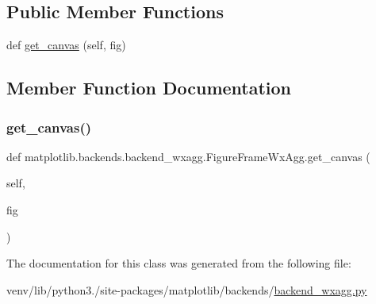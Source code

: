 \subsection*{Public Member Functions}
\begin{DoxyCompactItemize}
\item 
def \hyperlink{classmatplotlib_1_1backends_1_1backend__wxagg_1_1FigureFrameWxAgg_a999c74398921edcabde76d917f9472ee}{get\+\_\+canvas} (self, fig)
\end{DoxyCompactItemize}


\subsection{Member Function Documentation}
\mbox{\label{classmatplotlib_1_1backends_1_1backend__wxagg_1_1FigureFrameWxAgg_a999c74398921edcabde76d917f9472ee}} 
\subsubsection{\texorpdfstring{get\+\_\+canvas()}{get\_canvas()}}
{\footnotesize\ttfamily def matplotlib.\+backends.\+backend\+\_\+wxagg.\+Figure\+Frame\+Wx\+Agg.\+get\+\_\+canvas (\begin{DoxyParamCaption}\item[{}]{self,  }\item[{}]{fig }\end{DoxyParamCaption})}



The documentation for this class was generated from the following file\+:\begin{DoxyCompactItemize}
\item 
venv/lib/python3./site-\/packages/matplotlib/backends/\hyperlink{backend__wxagg_8py}{backend\+\_\+wxagg.\+py}\end{DoxyCompactItemize}
